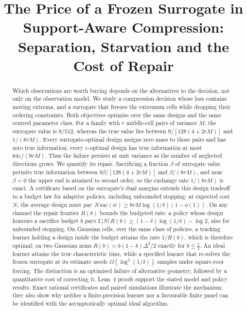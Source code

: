 



\title{The Price of a Frozen Surrogate in Support-Aware Compression:\\
Separation, Starvation and the Cost of Repair}

\author{
}

\maketitle

\begin{abstract}
Which observations are worth buying depends on the alternatives to the decision, not only on
the observation model. We study a compression decision whose loss contains moving extrema,
and a surrogate that freezes the extremum cells while dropping their ordering constraints.
Both objectives optimise over the same designs and the same centred parameter class.
For a family with $r$ middle-cell pairs of variance $M$, the surrogate value is $9/512$,
whereas the true value lies between $9/[128(4+2rM)]$ and $1/(8rM)$.
Every surrogate-optimal design assigns zero mass to those pairs and has zero true information;
every $\varepsilon$-optimal design has true information at most $64\varepsilon/(9rM)$.
Thus the failure persists at unit variance as the number of neglected directions grows.
We quantify its repair. Sacrificing a fraction $\beta$ of surrogate value permits true
information between $9\beta/[128(4+2rM)]$ and $\beta/(8rM)$, and near $\beta=0$ the upper end
is attained to second order, so the exchange rate $1/(8rM)$ is exact.
A certificate based on the surrogate's dual margins extends this design tradeoff to a budget
law for adaptive policies, including unbounded stopping: at expected cost $N$, the average
design must pay $N\,\mathrm{sac}(\bar w)\ge8rM\log(1/\delta)(1-o(1))$.
On any channel the repair frontier $R(b)$ bounds the budgeted rate: a policy whose design
honours a sacrifice budget $b$ pays $\mathbb E|N|\,R(b)\ge(1-\delta)\log(1/\delta)-\log2$, also
for unbounded stopping. On Gaussian cells, over the same class of policies, a tracking learner
holding a design inside the budget attains the rate $1/R(b)$, which is therefore optimal; on two
Gaussian arms $R(b)=b(1-b)\Delta^2/2$ exactly for $b\le\frac12$.
An ideal learner attains the true characteristic time, while a specified learner that
re-solves the frozen surrogate at its estimate needs $\Omega(\log^2(1/\delta))$ samples under
square-root forcing. The distinction is an optimised failure of alternative geometry, followed
by a quantitative cost of correcting it. Lean~4 proofs support the stated model and policy
results. Exact rational certificates and paired simulations illustrate the mechanism;
they also show why neither a finite-precision learner nor a favourable finite panel can be
identified with the asymptotically optimal ideal algorithm.
\end{abstract}

